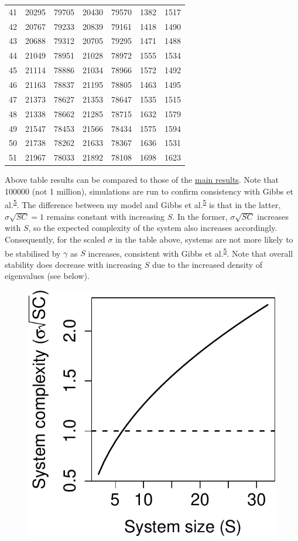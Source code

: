\documentclass[]{article}
\begin{document}
\begin{longtable}[]{@{}rrrrrrr@{}}
41 & 20295 & 79705 & 20430 & 79570 & 1382 & 1517\tabularnewline
42 & 20767 & 79233 & 20839 & 79161 & 1418 & 1490\tabularnewline
43 & 20688 & 79312 & 20705 & 79295 & 1471 & 1488\tabularnewline
44 & 21049 & 78951 & 21028 & 78972 & 1555 & 1534\tabularnewline
45 & 21114 & 78886 & 21034 & 78966 & 1572 & 1492\tabularnewline
46 & 21163 & 78837 & 21195 & 78805 & 1463 & 1495\tabularnewline
47 & 21373 & 78627 & 21353 & 78647 & 1535 & 1515\tabularnewline
48 & 21338 & 78662 & 21285 & 78715 & 1632 & 1579\tabularnewline
49 & 21547 & 78453 & 21566 & 78434 & 1575 & 1594\tabularnewline
50 & 21738 & 78262 & 21633 & 78367 & 1636 & 1531\tabularnewline
51 & 21967 & 78033 & 21892 & 78108 & 1698 & 1623\tabularnewline
\bottomrule
\end{longtable}

Above table results can be compared to those of the
\protect\hyperlink{IncrS}{main results}. Note that 100000 (not 1
million), simulations are run to confirm consistency with Gibbs et
al.\textsuperscript{\protect\hyperlink{ref-Gibbs2017}{5}}. The
difference between my model and Gibbs et
al.\textsuperscript{\protect\hyperlink{ref-Gibbs2017}{5}} is that in the
latter, \(\sigma\sqrt{SC} = 1\) remains constant with increasing \(S\).
In the former, \(\sigma\sqrt{SC}\) increases with \(S\), so the expected
complexity of the system also increases accordingly. Consequently, for
the scaled \(\sigma\) in the table above, systems are not more likely to
be stabilised by \(\gamma\) as \(S\) increases, consistent with Gibbs et
al.\textsuperscript{\protect\hyperlink{ref-Gibbs2017}{5}}. Note that
overall stability does decrease with increasing \(S\) due to the
increased density of eigenvalues (see below).

\begin{figure}[H]

{\centering \includegraphics{SI_files/figure-latex/unnamed-chunk-28-1} 

}

\end{figure}
\end{document}
